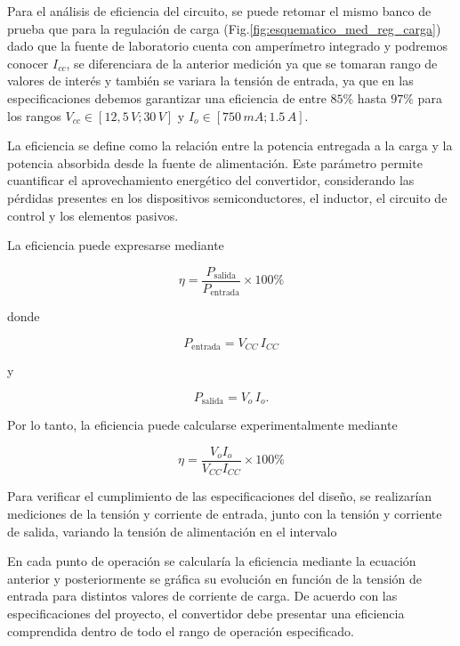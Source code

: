 \documentclass[]{article}
\begin{document}
Para el análisis de eficiencia del circuito, se puede retomar el mismo banco de prueba que para la regulación de carga (Fig.\ref{fig:esquematico_med_reg_carga}) dado que la fuente de laboratorio cuenta con amperímetro integrado y podremos conocer $I_{cc}$, se diferenciara de la anterior medición ya que se tomaran rango de valores de interés y también se variara la tensión de entrada, ya que en las especificaciones debemos garantizar una eficiencia de entre $85 \%$ hasta $97 \%$ para los rangos $V_{cc} \in [12,5 \, V ; 30 \, V]$ y $ I_o \in [750 \, mA ; 1.5 \,A]$.


La eficiencia se define como la relación entre la potencia entregada a la carga y la potencia absorbida desde la fuente de alimentación. Este parámetro permite cuantificar el aprovechamiento energético del convertidor, considerando las pérdidas presentes en los dispositivos semiconductores, el inductor, el circuito de control y los elementos pasivos.

La eficiencia puede expresarse mediante

\begin{equation}
	\eta=
	\frac{P_{\mathrm{salida}}}
	{P_{\mathrm{entrada}}}
	\times100 \%
\end{equation}

donde

\begin{equation}
	P_{\mathrm{entrada}}=V_{CC}\,I_{CC}
\end{equation}

y

\begin{equation}
	P_{\mathrm{salida}}=V_{o}\,I_{o}.
\end{equation}

Por lo tanto, la eficiencia puede calcularse experimentalmente mediante

\begin{equation}
	\eta=
	\frac{V_o I_o}
	{V_{CC} I_{CC}}
	\times100 \%
\end{equation}

Para verificar el cumplimiento de las especificaciones del diseño, se realizarían mediciones de la tensión y corriente de entrada, junto con la tensión y corriente de salida, variando la tensión de alimentación en el intervalo

En cada punto de operación se calcularía la eficiencia mediante la ecuación anterior y posteriormente se gráfica su evolución en función de la tensión de entrada para distintos valores de corriente de carga. De acuerdo con las especificaciones del proyecto, el convertidor debe presentar una eficiencia comprendida dentro de todo el rango de operación especificado.
\end{document}
